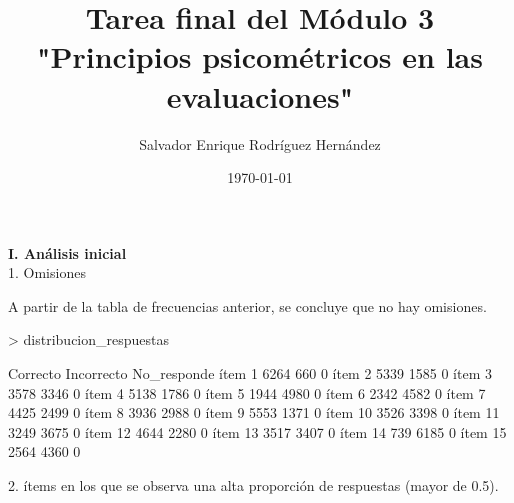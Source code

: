 \documentclass{article}
\title{Tarea final del Módulo 3 "Principios psicométricos en las evaluaciones"}
\author{Salvador Enrique Rodríguez Hernández}
\date{\today} %
\begin{document}


\maketitle

\textbf{I. Análisis inicial}\\ 
1. Omisiones


A partir de la tabla de frecuencias anterior, se concluye que no hay omisiones. 

\begin{Schunk}
\begin{Sinput}
> distribucion_respuestas
\end{Sinput}
\begin{Soutput}
        Correcto Incorrecto No_responde
ítem 1      6264        660           0
ítem 2      5339       1585           0
ítem 3      3578       3346           0
ítem 4      5138       1786           0
ítem 5      1944       4980           0
ítem 6      2342       4582           0
ítem 7      4425       2499           0
ítem 8      3936       2988           0
ítem 9      5553       1371           0
ítem 10     3526       3398           0
ítem 11     3249       3675           0
ítem 12     4644       2280           0
ítem 13     3517       3407           0
ítem 14      739       6185           0
ítem 15     2564       4360           0
\end{Soutput}
\end{Schunk}

2.	ítems en los que se observa una alta proporción de respuestas (mayor de 0.5). 
\end{document}
